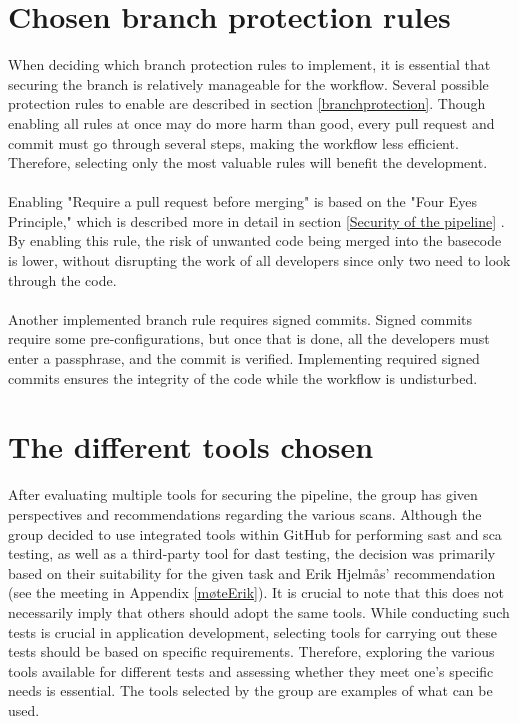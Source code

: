 \section{Chosen branch protection rules}
When deciding which branch protection rules to implement, it is essential that securing the branch is relatively manageable for the workflow. Several possible protection rules to enable are described in section \ref{branchprotection}. Though enabling all rules at once may do more harm than good, every pull request and commit must go through several steps, making the workflow less efficient. Therefore, selecting only the most valuable rules will benefit the development. 
\\~\\
Enabling "Require a pull request before merging" is based on the "Four Eyes Principle," which is described more in detail in section \ref{Security of the pipeline} \cite{foureyes}. By enabling this rule, the risk of unwanted code being merged into the basecode is lower, without disrupting the work of all developers since only two need to look through the code. 
\\~\\
Another implemented branch rule requires signed commits. Signed commits require some pre-configurations, but once that is done, all the developers must enter a passphrase, and the commit is verified. Implementing required signed commits ensures the integrity of the code while the workflow is undisturbed.

\section{The different tools chosen}
After evaluating multiple tools for securing the pipeline, the group has given perspectives and recommendations regarding the various scans. Although the group decided to use integrated tools within GitHub for performing \acrshort{sast} and \acrshort{sca} testing, as well as a third-party tool for \acrshort{dast} testing, the decision was primarily based on their suitability for the given task and Erik Hjelmås' recommendation (see the meeting in Appendix \ref{møteErik}). It is crucial to note that this does not necessarily imply that others should adopt the same tools. While conducting such tests is crucial in application development, selecting tools for carrying out these tests should be based on specific requirements. Therefore, exploring the various tools available for different tests and assessing whether they meet one's specific needs is essential. The tools selected by the group are examples of what can be used. 

